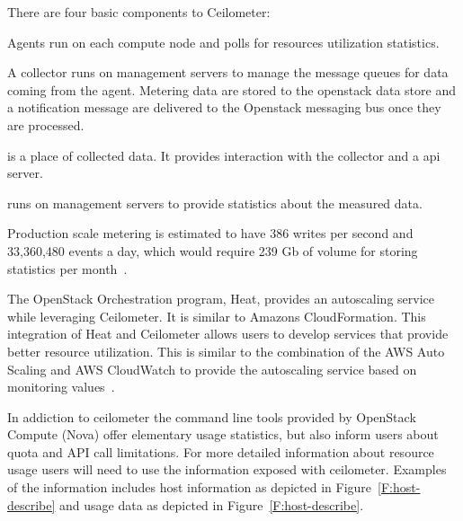 \documentclass{sig-alternate-05-2015}
\begin{document}
There are four basic components to Ceilometer:

\begin{description}
\setlength\itemsep{-2pt} 

\item[\it Agents.] Agents run on each compute node and polls for
  resources utilization statistics.

\item[\it Collector:] A collector runs on management servers to manage
  the message queues for data coming from the agent. Metering data are
  stored to the openstack data store and a notification message are
  delivered to the Openstack messaging bus once they are processed.

\item[\it Data store:] is a place of collected data. It provides
  interaction with the collector and a api server.

\item[\it API server:] runs on management servers to provide
  statistics about the measured data.

\end{description}

Production scale metering is estimated to have 386 writes per second and 33,360,480 events a day, which would require 239 Gb of volume for storing statistics per month~\cite{Barcet12}.

The OpenStack Orchestration program, Heat, provides an autoscaling
service while leveraging Ceilometer. It is similar to Amazons
CloudFormation.  This integration of Heat and Ceilometer allows users
to develop services that provide better resource utilization. This is
similar to the combination of the AWS Auto Scaling and AWS CloudWatch
to provide the autoscaling service based on monitoring
values~\cite{Abaakouk13}.

In addiction to ceilometer the command line tools provided by
OpenStack Compute (Nova) offer elementary usage statistics, but also
inform users about quota and API call limitations.  For more detailed
information about resource usage users will need to use the
information exposed with ceilometer.  Examples of the information
includes host information as depicted in Figure~\ref{F:host-describe}
and usage data as depicted in Figure~\ref{F:host-describe}.
\end{document}
